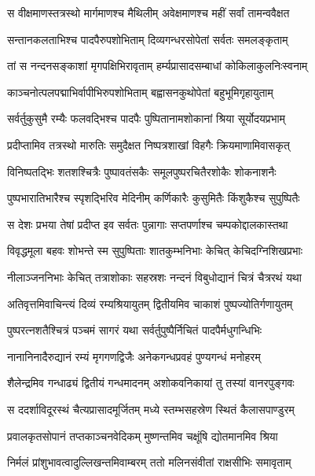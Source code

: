 
\twolineshloka
{स वीक्षमाणस्तत्रस्थो मार्गमाणश्च मैथिलीम्}
{अवेक्षमाणश्च महीं सर्वां तामन्ववैक्षत} %

\twolineshloka
{सन्तानकलताभिश्च पादपैरुपशोभिताम्}
{दिव्यगन्धरसोपेतां सर्वतः समलङ्कृताम्} %

\twolineshloka
{तां स नन्दनसङ्काशां मृगपक्षिभिरावृताम्}
{हर्म्यप्रासादसम्बाधां कोकिलाकुलनिःस्वनाम्} %

\twolineshloka
{काञ्चनोत्पलपद्माभिर्वापीभिरुपशोभिताम्}
{बह्वासनकुथोपेतां बहुभूमिगृहायुताम्} %

\twolineshloka
{सर्वर्तुकुसुमै रम्यैः फलवद्भिश्च पादपैः}
{पुष्पितानामशोकानां श्रिया सूर्योदयप्रभाम्} %

\twolineshloka
{प्रदीप्तामिव तत्रस्थो मारुतिः समुदैक्षत}
{निष्पत्रशाखां विहगैः क्रियमाणामिवासकृत्} %

\twolineshloka
{विनिष्पतद्भिः शतशश्चित्रैः पुष्पावतंसकैः}
{समूलपुष्परचितैरशोकैः शोकनाशनैः} %

\twolineshloka
{पुष्पभारातिभारैश्च स्पृशद्भिरिव मेदिनीम्}
{कर्णिकारैः कुसुमितैः किंशुकैश्च सुपुष्पितैः} %

\twolineshloka
{स देशः प्रभया तेषां प्रदीप्त इव सर्वतः}
{पुन्नागाः सप्तपर्णाश्च चम्पकोद्दालकास्तथा} %

\twolineshloka
{विवृद्धमूला बहवः शोभन्ते स्म सुपुष्पिताः}
{शातकुम्भनिभाः केचित् केचिदग्निशिखप्रभाः} %

\twolineshloka
{नीलाञ्जननिभाः केचित् तत्राशोकाः सहस्रशः}
{नन्दनं विबुधोद्यानं चित्रं चैत्ररथं यथा} %

\twolineshloka
{अतिवृत्तमिवाचिन्त्यं दिव्यं रम्यश्रियायुतम्}
{द्वितीयमिव चाकाशं पुष्पज्योतिर्गणायुतम्} %

\twolineshloka
{पुष्परत्नशतैश्चित्रं पञ्चमं सागरं यथा}
{सर्वर्तुपुष्पैर्निचितं पादपैर्मधुगन्धिभिः} %

\twolineshloka
{नानानिनादैरुद्यानं रम्यं मृगगणद्विजैः}
{अनेकगन्धप्रवहं पुण्यगन्धं मनोहरम्} %

\twolineshloka
{शैलेन्द्रमिव गन्धाढ्यं द्वितीयं गन्धमादनम्}
{अशोकवनिकायां तु तस्यां वानरपुङ्गवः} %

\twolineshloka
{स ददर्शाविदूरस्थं चैत्यप्रासादमूर्जितम्}
{मध्ये स्तम्भसहस्रेण स्थितं कैलासपाण्डुरम्} %

\twolineshloka
{प्रवालकृतसोपानं तप्तकाञ्चनवेदिकम्}
{मुष्णन्तमिव चक्षूंषि द्योतमानमिव श्रिया} %

\twolineshloka
{निर्मलं प्रांशुभावत्वादुल्लिखन्तमिवाम्बरम्}
{ततो मलिनसंवीतां राक्षसीभिः समावृताम्} %

